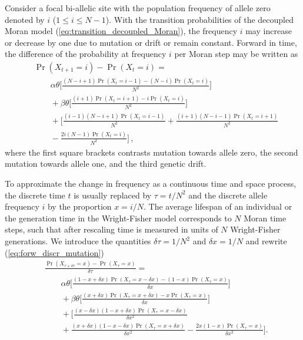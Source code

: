 \documentclass[preprint]{elsarticle}
\newcommand\x[1]{\ensuremath{X_{#1}}}
\begin{document}
Consider a focal bi-allelic site with the population frequency of allele zero denoted by $i$ ($1 \leq i \leq N-1$). With the transition probabilities of the decoupled Moran model (\ref{eq:transition_decoupled_Moran}), the frequency $i$ may increase or decrease by one due to mutation or drift or remain constant. Forward in time, the difference of the probability at frequency $i$ per Moran step may be written as
\begin{equation}\label{eq:forw_discr_mutation}
\begin{split}
&\Pr(\x{t+1}=i)-\Pr(\x{t}=i) = \\
&\qquad\alpha\theta \bigg[\frac{(N-i+1)\Pr(\x{t}=i-1) - (N-i)\Pr(\x{t}=i)}{N^2}\bigg]\\
&\qquad+\beta\theta \bigg[\frac{(i+1)\Pr(\x{t}=i+1) - i\Pr(\x{t}=i)}{N^2}\bigg]\\
&\qquad+\bigg[\frac{(i-1)(N-i+1)\Pr(\x{t}=i-1)}{N^2}+ \frac{(i+1)(N-i-1)\Pr(\x{t}=i+1)}{N^2}\\
&\qquad-\frac{2i(N-1)\Pr(\x{t}=i)}{N^2}\bigg]\,,
\end{split}
\end{equation}
where the first square brackets contrasts mutation towards allele zero, the second mutation towards allele one, and the third genetic drift.

To approximate the change in frequency as a continuous time and space process, the discrete time $t$ is usually replaced by $\tau = t/N^2$ and the discrete allele frequency $i$ by the proportion $x=i/N$. The average lifespan of an individual or the generation time in the Wright-Fisher model corresponds to $N$ Moran time steps, such that after rescaling time is measured in units of $N$ Wright-Fisher generations. We introduce the quantities $\delta \tau=1/N^2$ and $\delta x=1/N$ and rewrite (\ref{eq:forw_discr_mutation})
\begin{equation}\label{eq:forw_cont_mutation}
\begin{split}
&\frac{\Pr(\x{\tau+\delta \tau}=x)-\Pr(\x{\tau}=x)}{\delta \tau} =\\ &\qquad\alpha\theta \bigg[\frac{(1-x+\delta x)\Pr(\x{\tau}=x-\delta x) - (1-x)\Pr(\x{\tau}=x)}{\delta x}\bigg]\\
&\qquad+\beta\theta \bigg[\frac{(x+\delta x)\Pr(\x{\tau}=x+\delta x) - x\Pr(\x{\tau}=x)}{\delta x}\bigg]\\
&\qquad+\bigg[\frac{(x-\delta x)(1-x+\delta x)\Pr(\x{\tau}=x-\delta x)}{\delta x^2}\\
&\qquad+ \frac{(x+\delta x)(1-x-\delta x)\Pr(\x{\tau}=x+\delta x)}{\delta x^2}-\frac{2x(1-x)\Pr(\x{\tau}=x)}{\delta x^2}\bigg].\\
\end{split}
\end{equation}
\end{document}
